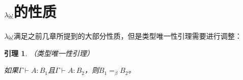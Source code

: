 \documentclass[UTF8]{article}
\newtheorem{lemma}[thm]{引理}
\begin{document}
	\section{$\lambda{\uline{\omega}}$的性质}
		\noindent
		$\lambda{\uline{\omega}}$满足之前几章所提到的大部分性质，但是类型唯一性引理需要进行调整：
		
		\begin{lemma}（类型唯一性引理）
			
			如果$\Gamma\vdash A:B_1$且$\Gamma\vdash A:B_2$，则$B_1=_\beta B_2$。
		\end{lemma}
\end{document}
